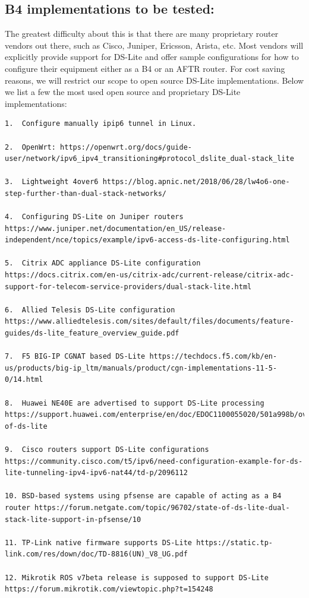 \documentclass[a4paper,12p]{article}
\begin{document}
\subsection{B4 implementations to be tested:}
The greatest difficulty about this is that there are many proprietary router vendors out there, such as Cisco, Juniper, Ericsson, Arista, etc. Most vendors will explicitly provide support for DS-Lite and offer sample configurations for how to configure their equipment either as a B4 or an AFTR router.
For cost saving reasons, we will restrict our scope to open source DS-Lite implementations.
Below we list a few the most used open source and proprietary DS-Lite implementations:

\begin{lstlisting}[basicstyle=\tiny]
1.	Configure manually ipip6 tunnel in Linux.

2.	OpenWrt: https://openwrt.org/docs/guide-user/network/ipv6_ipv4_transitioning#protocol_dslite_dual-stack_lite

3.	Lightweight 4over6 https://blog.apnic.net/2018/06/28/lw4o6-one-step-further-than-dual-stack-networks/

4.	Configuring DS-Lite on Juniper routers https://www.juniper.net/documentation/en_US/release-independent/nce/topics/example/ipv6-access-ds-lite-configuring.html

5.	Citrix ADC appliance DS-Lite configuration https://docs.citrix.com/en-us/citrix-adc/current-release/citrix-adc-support-for-telecom-service-providers/dual-stack-lite.html

6.	Allied Telesis DS-Lite configuration https://www.alliedtelesis.com/sites/default/files/documents/feature-guides/ds-lite_feature_overview_guide.pdf

7.	F5 BIG-IP CGNAT based DS-Lite https://techdocs.f5.com/kb/en-us/products/big-ip_ltm/manuals/product/cgn-implementations-11-5-0/14.html

8.	Huawei NE40E are advertised to support DS-Lite processing https://support.huawei.com/enterprise/en/doc/EDOC1100055020/501a998b/overview-of-ds-lite

9.	Cisco routers support DS-Lite configurations https://community.cisco.com/t5/ipv6/need-configuration-example-for-ds-lite-tunneling-ipv4-ipv6-nat44/td-p/2096112

10.	BSD-based systems using pfsense are capable of acting as a B4 router https://forum.netgate.com/topic/96702/state-of-ds-lite-dual-stack-lite-support-in-pfsense/10

11.	TP-Link native firmware supports DS-Lite https://static.tp-link.com/res/down/doc/TD-8816(UN)_V8_UG.pdf

12.	Mikrotik ROS v7beta release is supposed to support DS-Lite https://forum.mikrotik.com/viewtopic.php?t=154248
\end{lstlisting}
\end{document}
